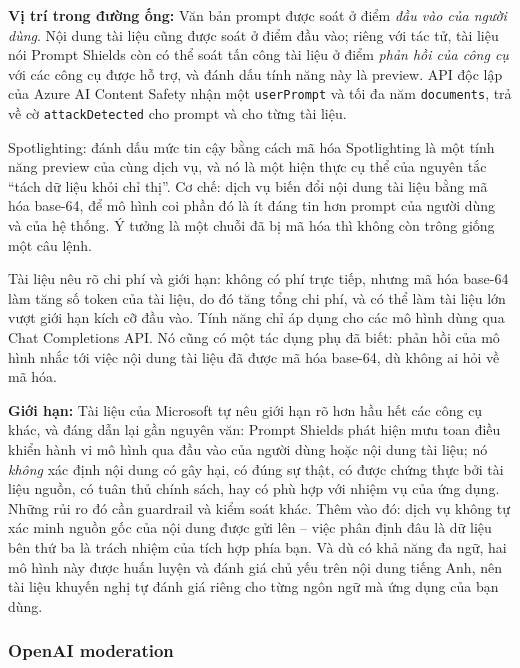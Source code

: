 \textbf{Vị trí trong đường ống:} Văn bản prompt được soát ở điểm \emph{đầu vào của người dùng}. Nội dung tài liệu cũng được soát ở điểm đầu vào; riêng với tác tử, tài liệu nói Prompt Shields còn có thể soát tấn công tài liệu ở điểm \emph{phản hồi của công cụ} với các công cụ được hỗ trợ, và đánh dấu tính năng này là preview. API độc lập của Azure AI Content Safety nhận một \texttt{userPrompt} và tối đa năm \texttt{documents}, trả về cờ \texttt{attackDetected} cho prompt và cho từng tài liệu.

\begin{deepdive}{Spotlighting: đánh dấu mức tin cậy bằng cách mã hóa}
Spotlighting là một tính năng preview của cùng dịch vụ, và nó là một hiện thực cụ thể của nguyên tắc ``tách dữ liệu khỏi chỉ thị''. Cơ chế: dịch vụ biến đổi nội dung tài liệu bằng mã hóa base-64, để mô hình coi phần đó là ít đáng tin hơn prompt của người dùng và của hệ thống. Ý tưởng là một chuỗi đã bị mã hóa thì không còn trông giống một câu lệnh.

Tài liệu nêu rõ chi phí và giới hạn: không có phí trực tiếp, nhưng mã hóa base-64 làm tăng số token của tài liệu, do đó tăng tổng chi phí, và có thể làm tài liệu lớn vượt giới hạn kích cỡ đầu vào. Tính năng chỉ áp dụng cho các mô hình dùng qua Chat Completions API. Nó cũng có một tác dụng phụ đã biết: phản hồi của mô hình nhắc tới việc nội dung tài liệu đã được mã hóa base-64, dù không ai hỏi về mã hóa.
\end{deepdive}

\textbf{Giới hạn:} Tài liệu của Microsoft tự nêu giới hạn rõ hơn hầu hết các công cụ khác, và đáng dẫn lại gần nguyên văn: Prompt Shields phát hiện mưu toan điều khiển hành vi mô hình qua đầu vào của người dùng hoặc nội dung tài liệu; nó \emph{không} xác định nội dung có gây hại, có đúng sự thật, có được chứng thực bởi tài liệu nguồn, có tuân thủ chính sách, hay có phù hợp với nhiệm vụ của ứng dụng. Những rủi ro đó cần guardrail và kiểm soát khác. Thêm vào đó: dịch vụ không tự xác minh nguồn gốc của nội dung được gửi lên -- việc phân định đâu là dữ liệu bên thứ ba là trách nhiệm của tích hợp phía bạn. Và dù có khả năng đa ngữ, hai mô hình này được huấn luyện và đánh giá chủ yếu trên nội dung tiếng Anh, nên tài liệu khuyến nghị tự đánh giá riêng cho từng ngôn ngữ mà ứng dụng của bạn dùng.

\subsubsection{OpenAI moderation}


